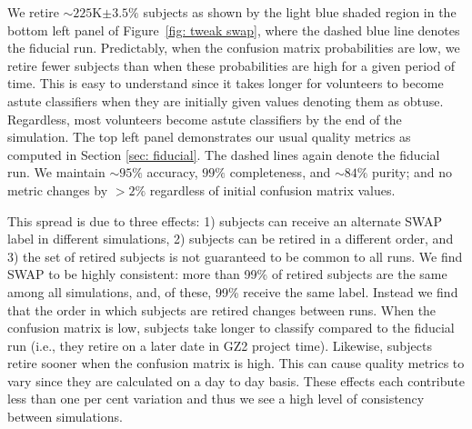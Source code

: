 \documentclass[twocolumn]{aastex6}
\begin{document}
We retire $\sim$$225$K$\pm3.5\%$ subjects as shown by the light blue shaded region in the bottom
left panel of Figure~\ref{fig: tweak swap}, where the dashed blue line denotes the fiducial run. 
Predictably, when the confusion matrix probabilities are low, we retire fewer subjects 
than when these probabilities are high for a given period of time. 
This is easy to understand since it takes longer for volunteers to become astute 
classifiers when they are initially given values denoting them as obtuse. 
Regardless, most volunteers become astute classifiers by the end of the simulation. 
The top left panel demonstrates our usual quality metrics as computed in Section \ref{sec: fiducial}.
The dashed lines again denote the fiducial run. 
We maintain $\sim$$95\%$ accuracy, $99\%$ completeness, and $\sim$$84\%$ purity;
 and no metric changes by $> 2\%$ regardless of initial confusion matrix values.  
 
This spread is due to three effects: 
1) subjects can receive an alternate SWAP label in different simulations, 
2) subjects can be retired in a different order, and 
3) the set of retired subjects is not guaranteed to be common to all runs. 
We find SWAP to be highly consistent: 
more than 99\% of retired subjects are the same among all simulations, 
and, of these, 99\% receive the same label.  Instead we find that the order in which 
subjects are retired changes between runs. 
When the confusion matrix is low, subjects take longer to classify compared to the fiducial run 
(i.e., they retire on a later date in GZ2 project time). 
Likewise, subjects retire sooner when the confusion matrix is high. 
This can cause quality metrics to vary since they are calculated on a day to day basis. 
These effects each contribute less than one per cent variation and thus we see a 
high level of consistency between simulations. 
\end{document}
